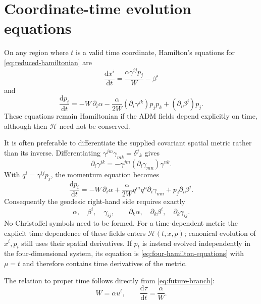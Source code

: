 \documentclass[11pt]{article}
\newcommand{\dd}{\mathrm{d}}
\newcommand{\Ham}{\mathcal{H}}
\begin{document}
\section{Coordinate-time evolution equations}

On any region where \(t\) is a valid time coordinate, Hamilton's equations for
\cref{eq:reduced-hamiltonian} are
\begin{equation}
 \boxed{
 \frac{\dd x^i}{\dd t}
 =\frac{\alpha\gamma^{ij}p_j}{W}-\beta^i
 }
 \label{eq:position-equation}
\end{equation}
and
\begin{equation}
 \boxed{
 \frac{\dd p_i}{\dd t}
 =-W\,\partial_i\alpha
  -\frac{\alpha}{2W}(\partial_i\gamma^{jk})p_jp_k
  +(\partial_i\beta^j)p_j.
 }
 \label{eq:momentum-equation-inverse}
\end{equation}
These equations remain Hamiltonian if the ADM fields depend explicitly on
time, although then \(\Ham\) need not be conserved.

It is often preferable to differentiate the supplied covariant spatial
metric rather than its inverse.  Differentiating
\(\gamma^{jm}\gamma_{mk}=\delta^j{}_k\) gives
\begin{equation}
 \partial_i\gamma^{jk}
 =-\gamma^{jm}(\partial_i\gamma_{mn})\gamma^{nk}.
 \label{eq:inverse-derivative}
\end{equation}
With \(q^i=\gamma^{ij}p_j\), the momentum equation becomes
\begin{equation}
 \boxed{
 \frac{\dd p_i}{\dd t}
 =-W\,\partial_i\alpha
  +\frac{\alpha}{2W}q^mq^n\partial_i\gamma_{mn}
  +p_j\partial_i\beta^j.
 }
 \label{eq:momentum-equation-covariant}
\end{equation}
Consequently the geodesic right-hand side requires exactly
\begin{equation}
 \alpha,\quad\beta^i,\quad\gamma_{ij},
 \qquad
 \partial_k\alpha,\quad\partial_k\beta^i,
 \quad\partial_k\gamma_{ij}.
 \label{eq:required-data}
\end{equation}
No Christoffel symbols need to be formed.  For a time-dependent metric the
explicit time dependence of these fields enters \(\Ham(t,x,p)\); canonical
evolution of \(x^i,p_i\) still uses their spatial derivatives.  If \(p_t\)
is instead evolved independently in the four-dimensional system, its equation
is \cref{eq:four-hamilton-equations} with \(\mu=t\) and therefore contains
time derivatives of the metric.

The relation to proper time follows directly from
\cref{eq:future-branch}:
\begin{equation}
 W=\alpha u^t,
 \qquad
 \frac{\dd\tau}{\dd t}=\frac{\alpha}{W}.
 \label{eq:proper-coordinate-time}
\end{equation}
\end{document}
